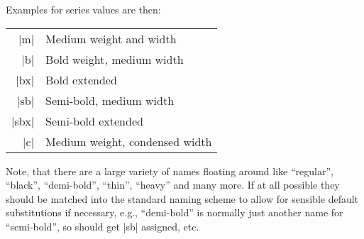 \documentclass{ltxguide}[1995/11/28]
\begin{document}
Examples for series values are then:
\begin{center}
  \begin{minipage}{.7\linewidth}
    \begin{tabular}{rl}
      |m|   & Medium weight and width  \\
      |b|   & Bold weight, medium width  \\
      |bx|  & Bold extended \\
      |sb|  & Semi-bold, medium width\\
      |sbx| & Semi-bold extended\\
      |c|   & Medium weight, condensed width
    \end{tabular}
  \end{minipage}
\end{center}
Note, that there are a large variety of names floating around like
``regular'', ``black'', ``demi-bold'', ``thin'', ``heavy'' and many
more.  If at all possible they should be matched into the standard
naming scheme to allow for sensible default substitutions if necessary,
e.g., ``demi-bold'' is normally just another name for ``semi-bold'', so
should get |sb| assigned, etc.
\end{document}
